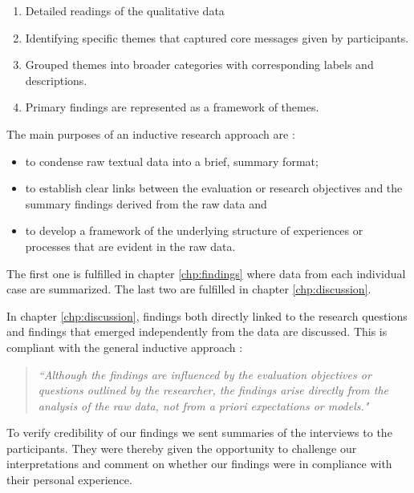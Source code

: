 \begin{enumerate}
\vspace{0,5cm}
\item Detailed readings of the qualitative data
\item Identifying specific themes that captured core messages given by participants.
\item Grouped themes into broader categories with corresponding labels and descriptions.
\item Primary findings are represented as a framework of themes.
\vspace{0,5cm}
\end{enumerate}

The main purposes of an inductive research approach are \cite{thomas2006general}: 
\begin{itemize}
\item to condense raw textual data into a brief, summary format;
\item to establish clear links between the evaluation or research objectives and the summary findings derived from the raw data and
\item to develop a framework of the underlying structure  of experiences or processes that are evident in the raw data.
\end{itemize}
The first one is fulfilled in chapter \ref{chp:findings} where data from each individual case are summarized. The last two are fulfilled in chapter \ref{chp:discussion}.

In chapter \ref{chp:discussion}, findings both directly linked to the research questions and findings that emerged independently from the data are discussed. This is compliant with the general inductive approach \cite{thomas2006general}:

\begin{quote}
\textit{``Although the findings are influenced by the evaluation objectives or
questions outlined by the researcher, the findings arise directly from the analysis of the raw data, not from a priori expectations or models."}
\end{quote}


To verify credibility of our findings we sent summaries of the interviews to the participants. They were thereby given the opportunity to challenge our interpretations and comment on whether our findings were in compliance with their personal experience. 

